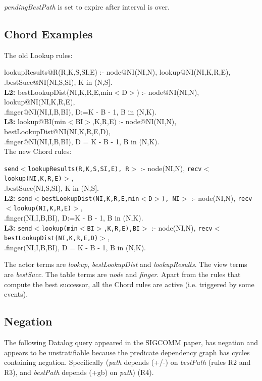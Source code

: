 \documentclass{article}
\newcommand{\code}[1]{{\tt \small #1}}
\newcommand{\datalogspace}{\textcolor[gray]{1}{.}\hspace{0.8in}}
\begin{document}
{\em pendingBestPath} is set to expire after interval is over.


\subsection{Chord Examples}

The old Lookup rules:

 lookupResults@R(R,K,S,SI,E) :- node@NI(NI,N), lookup@NI(NI,K,R,E), \\
\datalogspace bestSucc@NI(NI,S,SI), K in (N,S].\\
{\bf L2:} bestLookupDist(NI,K,R,E,min$<$D$>$) :- node@NI(NI,N), lookup@NI(NI,K,R,E), \\
\datalogspace finger@NI(NI,I,B,BI), D:=K - B - 1, B in (N,K).\\
{\bf L3:} lookup@BI(min$<$BI$>$,K,R,E) :- node@NI(NI,N), bestLookupDist@NI(NI,K,R,E,D), \\
\datalogspace finger@NI(NI,I,B,BI), D = K - B - 1,  B in (N,K).\\

\noindent The new Chord rules:

 \code{send$<$lookupResults(R,K,S,SI,E), R$>$} :- node(NI,N), \code{recv$<$lookup(NI,K,R,E)$>$}, \\
\datalogspace bestSucc(NI,S,SI), K in (N,S].\\
{\bf L2:} \code{send$<$bestLookupDist(NI,K,R,E,min$<$D$>$), NI$>$} :- node(NI,N), \code{recv$<$lookup(NI,K,R,E)$>$}, \\
\datalogspace finger(NI,I,B,BI), D:=K - B - 1, B in (N,K).\\
{\bf L3:} \code{send$<$lookup(min$<$BI$>$,K,R,E),BI$>$} :- node(NI,N), \code{recv$<$bestLookupDist(NI,K,R,E,D)$>$}, \\
\datalogspace finger(NI,I,B,BI), D = K - B - 1,  B in (N,K).

The actor terms are {\em lookup}, {\em bestLookupDist} and {\em
  lookupResults}. The view terms are {\em bestSucc}. The table terms are
  {\em node} and {\em finger}. Apart from the rules that compute the best successor, all the Chord
rules are active (i.e. triggered by some events).



\subsection{Negation}

The following Datalog query appeared in the SIGCOMM paper, has negation
and appears to be unstratifiable because the predicate dependency graph
has cycles containing negation. Specifically ({\em path}
depends (+/-) on {\em bestPath} (rules R2 and R3), and {\em bestPath}
depends (+gb) on {\em path}) (R4).
\end{document}
